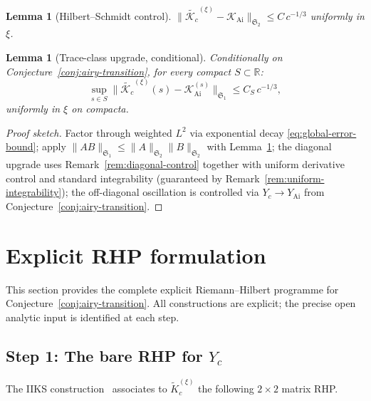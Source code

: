 \documentclass[12pt,a4paper]{amsart}
\newtheorem{lemma}[theorem]{Lemma}
\theoremstyle{definition}
\theoremstyle{remark}
\newcommand{\norm}[1]{\|#1\|}
\newcommand{\Kc}{\mathcal{K}_c}
\newcommand{\Kairy}{\mathcal{K}_{\mathrm{Ai}}}
\newcommand{\R}{\mathbb{R}}
\begin{document}
\begin{lemma}[Hilbert--Schmidt control]
\label{lem:hs}
$\norm{\widetilde{\Kc}^{(\xi)}-\Kairy}_{\mathfrak{S}_2}\le C\,c^{-1/3}$
uniformly in $\xi$.
\end{lemma}

\begin{lemma}[Trace-class upgrade, conditional]
\label{lem:trace-upgrade}
Conditionally on Conjecture~\ref{conj:airy-transition},
for every compact $S\subset\R$:
\begin{equation}\label{eq:trace-upgrade-bound}
  \sup_{s\in S}
  \norm{\widetilde{\Kc}^{(\xi)}(s)-\Kairy^{(s)}}_{\mathfrak{S}_1}
  \le C_S\,c^{-1/3},
\end{equation}
uniformly in $\xi$ on compacta.
\end{lemma}

\begin{proof}[Proof sketch]
Factor through weighted $L^2$ via exponential decay
\eqref{eq:global-error-bound}; apply
$\norm{AB}_{\mathfrak{S}_1}\le\norm{A}_{\mathfrak{S}_2}\norm{B}_{\mathfrak{S}_2}$
with Lemma~\ref{lem:hs}; the diagonal upgrade uses
Remark~\ref{rem:diagonal-control} together with uniform derivative control
and standard integrability (guaranteed by Remark~\ref{rem:uniform-integrability});
the off-diagonal oscillation is controlled
via $Y_c\to Y_{\mathrm{Ai}}$ from Conjecture~\ref{conj:airy-transition}.
\end{proof}

\section{Explicit RHP formulation}
\label{sec:rhp}

This section provides the complete explicit Riemann--Hilbert programme
for Conjecture~\ref{conj:airy-transition}.
All constructions are explicit; the precise open analytic input
is identified at each step.

\subsection{Step 1: The bare RHP for $Y_c$}

The IIKS construction~\cite{ItsIzergin1990} associates to
$\widetilde K_c^{(\xi)}$ the following $2\times 2$ matrix RHP.
\end{document}
